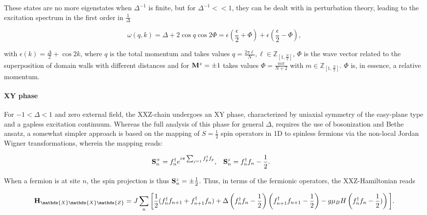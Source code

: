\documentclass{homework}
\begin{document}
These states are no more eigenstates when $\Delta^{-1}$ is finite, but for $\Delta^{-1} << 1$, they can be dealt with in perturbation theory, leading to the excitation spectrum in the first order in $\frac{1}{\Delta}$

$$
    \omega(q,k) = \Delta + 2 \cos q \cos 2\Phi = \epsilon \left(\frac{\epsilon}{2} + \Phi\right) + \epsilon \left(\frac{\epsilon}{2} - \Phi\right),
$$

with $\epsilon(k) = \frac{\Delta}{2} + \cos 2k$, where $q$ is the total momentum and takes values $q = \frac{2\pi \ell}{N}, \ell \in \mathds{Z}_{[1, \frac{N}{2}]}$, $\Phi$ is the wave vector related to the superposition of domain walls with different distances and for ${\bf M}^z = \pm 1$ takes values $\Phi = \frac{m\pi}{N+2}$ with $m \in \mathds{Z}_{[1, \frac{N}{2}]}$. $\Phi$ is, in essence, a relative momentum. \\ 


\clearpage

\paragraph{\textbf{XY phase}}

For $-1 < \Delta < 1$ and zero external field, the XXZ-chain undergoes an XY phase, characterized by uniaxial symmetry of the easy-plane type and a gapless excitation continuum. Whereas the full analysis of this phase for general $\Delta$, requires the use of bosonization and Bethe ansatz, a somewhat simpler approach is based on the mapping of $S = \frac{1}{2}$ spin operators in 1D to spinless fermions via the non-local Jordan Wigner transformations, wherein the mapping reads:

\begin{align}
    {\bf S}_{n}^+ &= f_n^\dagger e^{i\pi \sum_{j = 1} f_p^\dagger f_p}, & {\bf S}_n^z &= f_n^\dagger f_n - \frac{1}{2}.
\end{align}

When a fermion is at site $n$, the spin projection is thus ${\bf S}_n^z = \pm \frac{1}{2}$. Thus, in terms of the fermionic operators, the XXZ-Hamiltonian reads 

\begin{equation}
    {\bf H}_{\mathds{X}\mathds{X}\mathds{Z}} = J \sum_{n} \bigg[ \frac{1}{2} (f_n^\dagger f_{n+1} + f_{n+1}^\dagger f_n) + \Delta \left(f_n^\dagger f_n - \frac{1}{2}\right) \left(f_{n+1}^\dagger f_{n+1} - \frac{1}{2}\right) - g\mu_B H \left(f_n^\dagger f_n - \frac{1}{2})\right) \bigg].
    \label{XXZ fermionic hamiltonian}
\end{equation}
\end{document}
